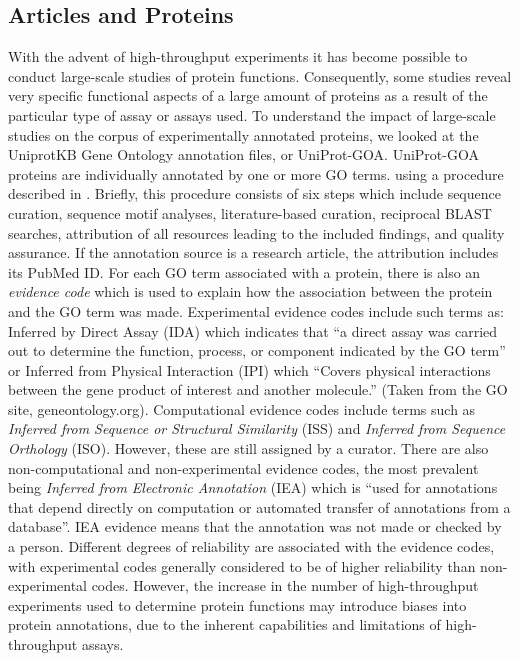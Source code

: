 \documentclass[10pt]{article}
\begin{document}
\subsection*{Articles and Proteins} With the advent of high-throughput experiments it has become
possible to conduct large-scale studies of protein functions.  Consequently, some studies reveal
very specific functional aspects of a large amount of proteins as a result of the particular type
of assay or assays used. To understand the impact of large-scale studies on the corpus of
experimentally annotated proteins, we looked at the UniprotKB Gene Ontology annotation files, or
UniProt-GOA. UniProt-GOA proteins are individually annotated by one or more GO terms.
using a procedure described in \cite{Uniprot-GOA}. Briefly, this procedure consists
of six steps which include sequence curation, sequence motif analyses, literature-based curation,
reciprocal BLAST\cite{Altschul1997Gapped} searches, attribution of all resources leading to the included
findings, and quality assurance. If the annotation source is a research article, the attribution
includes its PubMed ID. For each GO term associated with a protein, there is also an
\textit{evidence code} which is used to explain how the association between the protein and the
GO term was made.  Experimental evidence codes include such terms as: Inferred by Direct Assay
(IDA) which indicates that ``a direct assay was carried out to determine the function, process,
or component indicated by the GO term'' or Inferred from Physical Interaction (IPI) which
``Covers physical interactions between the gene product of interest and another molecule.''
(Taken from the GO site, geneontology.org).  Computational evidence codes include terms such
as \textit{Inferred from Sequence or Structural Similarity} (ISS) and \textit{Inferred from
Sequence Orthology} (ISO).  However, these are still assigned by a curator. There are also
non-computational and non-experimental evidence codes, the most prevalent being \textit{Inferred
from Electronic Annotation} (IEA) which is ``used for annotations that depend directly on
computation or automated transfer of annotations from a database''. IEA evidence means that the
annotation was not made or checked by a person.  Different degrees of reliability are associated
with the evidence codes, with experimental codes generally considered to be of higher reliability
than non-experimental codes. However, the increase in the number of high-throughput experiments
used to determine protein functions may introduce biases into protein annotations, due to the
inherent capabilities and limitations of high-throughput assays.  
\end{document}
